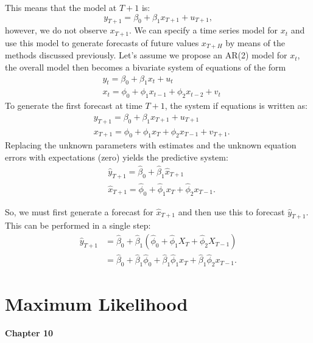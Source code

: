 \documentclass[11pt]{article}
\begin{document}
This means that the model at $T+1$ is:
\[ y_{T+1} = \beta_0 + \beta_1 x_{T+1} + u_{T+1},\]
however, we do not observe $x_{T+1}$. We can specify a time series model for $x_t$ and use this model to generate forecasts of future values $x_{T+H}$ by means of the methods discussed previously. Let's assume we propose an AR(2) model for $x_t$, the overall model then becomes a bivariate system of equations of the form
\begin{equation}
\begin{aligned}
& y_t=\beta_0+\beta_1 x_t+u_t \\
& x_t=\phi_0+\phi_1 x_{t-1}+\phi_2 x_{t-2}+v_t
\end{aligned}
\end{equation}
To generate the first forecast at time $T+1$, the system if equations is written as:
\begin{equation}
\begin{aligned}
& y_{T+1}=\beta_0+\beta_1 x_{T+1}+u_{T+1} \\
& x_{T+1}=\phi_0+\phi_1 x_T+\phi_2 x_{T-1}+v_{T+1} .
\end{aligned}
\end{equation}
Replacing the unknown parameters with estimates and the unknown equation errors with expectations (zero) yields the predictive system:
\begin{equation}
\begin{aligned}
& \widehat{y}_{T+1}=\widehat{\beta}_0+\widehat{\beta}_1 \widehat{x}_{T+1} \\
& \widehat{x}_{T+1}=\widehat{\phi}_0+\widehat{\phi}_1 x_T+\widehat{\phi}_2 x_{T-1} .
\end{aligned}
\end{equation}

So, we must first generate a forecast for $\hat{x}_{T+1}$ and then use this to forecast $\hat{y}_{T+1}$. This can be performed in a single step:
\begin{equation}
\begin{aligned}
\widehat{y}_{T+1} & =\widehat{\beta}_0+\widehat{\beta}_1\left(\widehat{\phi}_0+\widehat{\phi}_1 X_T+\widehat{\phi}_2 X_{T-1}\right) \\
& =\widehat{\beta}_0+\widehat{\beta}_1 \widehat{\phi}_0+\widehat{\beta}_1 \widehat{\phi}_1 x_T+\widehat{\beta}_1 \widehat{\phi}_2 x_{T-1} .
\end{aligned}
\end{equation}




\newpage
\section{Maximum Likelihood}
\textbf{Chapter 10}
\end{document}
